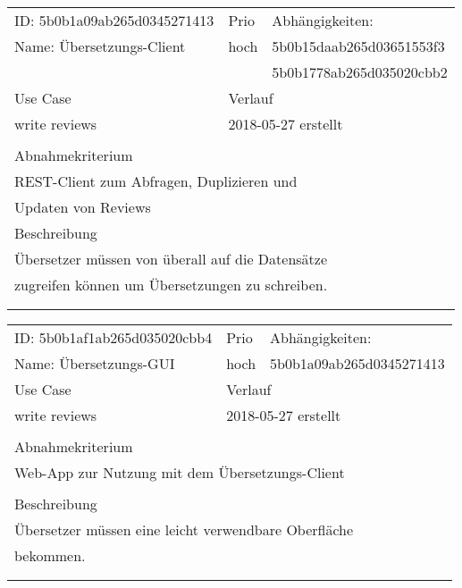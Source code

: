 \documentclass{article}
\begin{document}
\vfill
\resizebox{10cm}{!} {
\begin{tabular}{lllll}
  \hline
  \multicolumn{2}{|l|}{\tiny{ID: 5b0b1a09ab265d0345271413}} & Prio & \multicolumn{2}{|l|}{Abhängigkeiten:} \\
  \multicolumn{2}{|l|}{Name: Übersetzungs-Client} & hoch & \multicolumn{2}{|l|}{\tiny{5b0b15daab265d03651553f3}} \\
  \multicolumn{2}{|l|}{} &  & \multicolumn{2}{|l|}{\tiny{5b0b1778ab265d035020cbb2}} \\
  \hline
  \multicolumn{2}{|l|}{Use Case} & \multicolumn{3}{|l|}{Verlauf} \\
  \multicolumn{2}{|l|}{write reviews} & \multicolumn{3}{|l|}{2018-05-27 erstellt} \\
  \multicolumn{2}{|l|}{} & \multicolumn{3}{|l|}{} \\
  \hline
  \multicolumn{5}{|l|}{Abnahmekriterium} \\
  \multicolumn{5}{|l|}{REST-Client zum Abfragen, Duplizieren und} \\
  \multicolumn{5}{|l|}{Updaten von Reviews} \\
  \hline
  \multicolumn{5}{|l|}{Beschreibung} \\
  \multicolumn{5}{|l|}{Übersetzer müssen von überall auf die Datensätze} \\
  \multicolumn{5}{|l|}{zugreifen können um Übersetzungen zu schreiben.} \\
  \multicolumn{5}{|l|}{} \\
  \multicolumn{5}{|l|}{} \\
  \hline
\end{tabular}
}
\resizebox{10cm}{!} {
\begin{tabular}{lllll}
  \hline
  \multicolumn{2}{|l|}{\tiny{ID: 5b0b1af1ab265d035020cbb4}} & Prio & \multicolumn{2}{|l|}{Abhängigkeiten:} \\
  \multicolumn{2}{|l|}{Name: Übersetzungs-GUI} & hoch & \multicolumn{2}{|l|}{\tiny{5b0b1a09ab265d0345271413}} \\
  \hline
  \multicolumn{2}{|l|}{Use Case} & \multicolumn{3}{|l|}{Verlauf} \\
  \multicolumn{2}{|l|}{write reviews} & \multicolumn{3}{|l|}{2018-05-27 erstellt} \\
  \multicolumn{2}{|l|}{} & \multicolumn{3}{|l|}{} \\
  \hline
  \multicolumn{5}{|l|}{Abnahmekriterium} \\
  \multicolumn{5}{|l|}{Web-App zur Nutzung mit dem Übersetzungs-Client} \\
  \multicolumn{5}{|l|}{} \\
  \hline
  \multicolumn{5}{|l|}{Beschreibung} \\
  \multicolumn{5}{|l|}{Übersetzer müssen eine leicht verwendbare Oberfläche} \\
  \multicolumn{5}{|l|}{bekommen.} \\
  \multicolumn{5}{|l|}{} \\
  \multicolumn{5}{|l|}{} \\
  \hline
\end{tabular}
}
\end{document}
